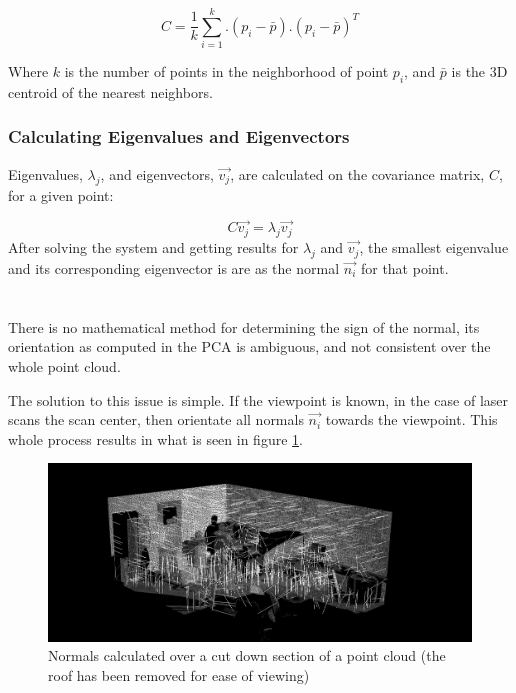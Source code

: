 			\begin{equation}
			C = \frac{1}{k} \sum_{i=1}^{k}.(p_i - \bar{p}).(p_i - \bar{p})^T
			\end{equation}
			
			Where $k$ is the number of points in the neighborhood of point $p_i$, and $\bar{p}$ is the 3D centroid of the nearest neighbors.
				
		\subsubsection{Calculating Eigenvalues and Eigenvectors}
			Eigenvalues, $\lambda_j$, and eigenvectors, $\vec{v_j}$, are calculated on the covariance matrix, $C$, for a given point:
			
			\begin{equation}
			C \vec{v_j} = \lambda_j \vec{v_j}
			\end{equation}
			After solving the system and getting results for $\lambda_j$ and $\vec{v_j}$, the smallest eigenvalue and its corresponding eigenvector is are as the normal $\vec{n_i}$ for that point.\\
			\\
			\\
			There is no mathematical method for determining the sign of the normal, its orientation as computed in the PCA is ambiguous, and not consistent over the whole point cloud. 
			
			The solution to this issue is simple. If the viewpoint is known, in the case of laser scans the scan center, then orientate all normals $\vec{n_i}$ towards the viewpoint. This whole process results in what is seen in figure \ref{fig:Normals}.
			
			\begin{figure}[H]
			\centering
			\includegraphics[width=1\linewidth]{Includes/images/Normals}
			\caption{Normals calculated over a cut down section of a point cloud (the roof has been removed for ease of viewing)}
			\label{fig:Normals}
			\end{figure}
		

